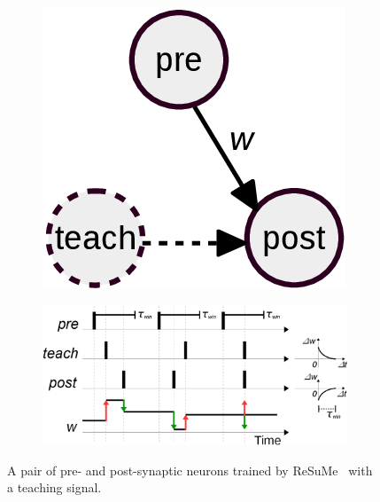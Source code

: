 \begin{figure}
	\centering
	\begin{subfigure}[c]{0.25\textwidth}
		\includegraphics[width=\textwidth]{pics_sdlm/resume.png}
	\end{subfigure}
	\begin{subfigure}[c]{0.7\textwidth}
		\includegraphics[width=\textwidth]{pics_sdlm/resume2.png}
	\end{subfigure}
	\caption[ReSuMe algorithm.]{A pair of pre- and post-synaptic neurons trained by ReSuMe~\citep{ponulak2010supervised} with a teaching signal.}
	\label{fig:resume}
\end{figure}

